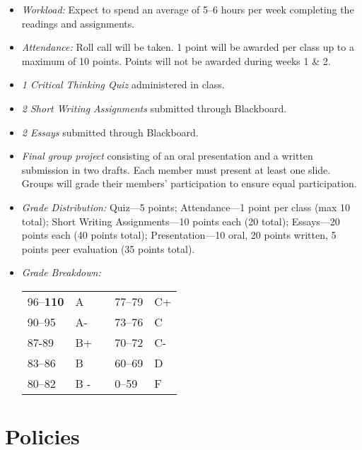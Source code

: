 \documentclass[article,oneside]{memoir}
\begin{document}
\begin{itemize}
\item \textit{Workload:} Expect to spend an average of 5--6 hours per week  completing the readings and assignments.

\item \textit{Attendance:} Roll call will be taken. 1 point will be awarded per class up to a maximum of 10 points. Points will not be awarded during weeks 1 \& 2. 

\item \textit{1 Critical Thinking Quiz} administered in class. 

\item \textit{2 Short Writing Assignments} submitted through Blackboard. 

\item \textit{2 Essays} submitted through Blackboard. 

\item \textit{Final group project} consisting of an oral presentation and a written submission in two drafts. Each member must present at least one slide. Groups will grade their members' participation to ensure equal participation.  

\item \textit{Grade Distribution:}  Quiz---5 points; Attendance---1 point per class (max 10 total);  Short Writing Assignments---10 points each (20 total); Essays---20 points each (40 points total); Presentation---10 oral, 20 points written, 5 points peer evaluation (35 points total).

\item \textit{Grade Breakdown:}

 \begin{tabular}{ | l | l | p{2cm} | l | l | }
    \hline 
96--\textbf{110} & A  & &  77--79 &  C+ \\  
90--95 & A- & &  73--76 & C \\
87-89 & B+ &  &  70--72 & C- \\ 
83--86 & B  & &  60--69 & D\\
80--82 & B - & & 0--59 & F\\ \hline
    \end{tabular}


\end{itemize}




\section{Policies}
\end{document}
